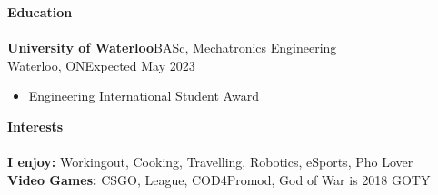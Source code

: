 \documentclass[a4paper]{article}
\newcommand{\lineunder} {
    \vspace{-8pt} \\
    \hspace{-18pt} \hrulefill \\
}
\newcommand{\header} [1] {
    {\hspace{-18pt}\vspace*{6pt} \textcolor{headerGray}{\textbf{\large{#1}}}}
    \vspace{-6pt} \lineunder
}
\begin{document}
\header{Education}
\textbf{\normalsize University of Waterloo}\hfill BASc, Mechatronics Engineering\\
\textcolor{educationGray}{\small Waterloo, ON\hfill Expected May 2023}
\vspace{-2mm}
\begin{itemize}[leftmargin=*]\itemsep -0.5pt
	\item Engineering International Student Award
\end{itemize}
\vspace{2mm}

\header{Interests}
\textbf{I enjoy: } Workingout, Cooking, Travelling, Robotics, eSports,  Pho Lover\\
\vspace{1.5mm}
\textbf{Video Games: } CSGO, League, COD4Promod, God of War is 2018 GOTY\\
\end{document}
